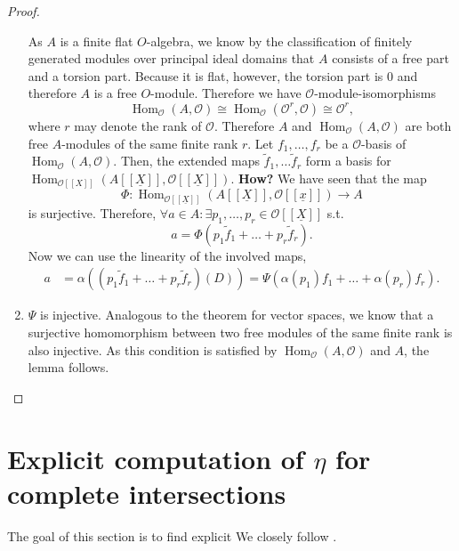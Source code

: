 \documentclass{article}
\theoremstyle{plain}%
\theoremstyle{definition}
\theoremstyle{remark}
\renewcommand{\hom}{\operatorname{Hom}}
\begin{document}
\begin{proof}
\begin{enumerate}
        As \(A\) is a finite flat \(O\)-algebra, we know by the classification of finitely generated modules
        over principal ideal domains that \(A\) consists of a free part and a torsion part. Because it is flat,
        however, the torsion part is 0 and therefore \(A\) is a free \(O\)-module.
        Therefore we have \(\mathcal{O}\)-module-isomorphisms
        \[
            \hom_\mathcal{O}(A, \mathcal{O}) \cong \hom_\mathcal{O}(\mathcal{O}^r, \mathcal{O})
            \cong \mathcal{O}^r,
        \]
        where \(r\) may denote the rank of \(\mathcal{O}\). 
        Therefore \(A\) and \(\hom_\mathcal{O}(A, \mathcal{O})\) are both free \(A\)-modules of the 
        same finite rank \(r\).
        Let \(f_1, \dots, f_r\) be a \(\mathcal{O}\)-basis of \(\hom_\mathcal{O}(A, \mathcal{O})\). 
        Then, the extended maps \(\tilde f_1, \dots \tilde f_r\) form a basis for
        \(\hom_{\mathcal{O}[[X]]}(A[[\underline{X}]], \mathcal{O}[[\underline{X}]]).\)
        \textbf{How?}
        We have seen that the map 
        \[
            \Phi\colon \hom_{\mathcal{O}[[\underline{X}]]}(A[[\underline{X}]], \mathcal{O}[[\underline{x}]]) \to A
        \] 
        is surjective.
        Therefore, \(\forall a \in A\colon \exists p_1, \dots, p_r \in \mathcal{O}[[\underline{X}]]\) s.t.
        \[
            a = \Phi(p_1 \tilde f_1 + \dots + p_r \tilde f_r).
        \]
        Now we can use the linearity of the involved maps,
        \begin{align*} 
                a &= \alpha((p_1 \tilde f_1 + \dots + p_r \tilde f_r)(D))
                = \Psi(\alpha(p_1) f_1 + \dots + \alpha(p_r) f_r).
        \end{align*}
        \item \(\Psi\) is injective.
        Analogous to the theorem for vector spaces, we know that a surjective homomorphism between two free modules 
        of the same finite rank is also injective.
        As this condition is satisfied by \(\hom_\mathcal{O}(A, \mathcal{O})\) and \(A\), 
        the lemma follows.
    \end{enumerate}
\end{proof}

\section{Explicit computation of \texorpdfstring{\(\eta\)}{η} for complete intersections}

The goal of this section is to find explicit 
We closely follow \cite[chapter 5.4]{darmon1995fermat}.
\end{document}
